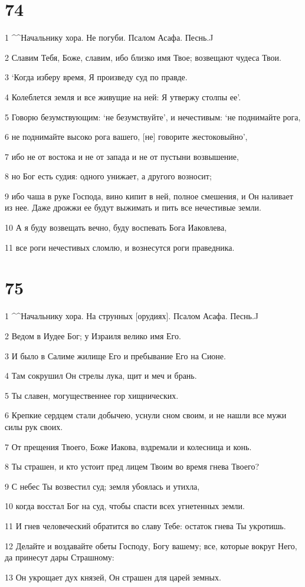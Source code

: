 \chapter{74}

\par 1 ^^Начальнику хора. Не погуби. Псалом Асафа. Песнь.^^
\par 2 Славим Тебя, Боже, славим, ибо близко имя Твое; возвещают чудеса Твои.
\par 3 `Когда изберу время, Я произведу суд по правде.
\par 4 Колеблется земля и все живущие на ней: Я утвержу столпы ее'.
\par 5 Говорю безумствующим: `не безумствуйте', и нечестивым: `не поднимайте рога,
\par 6 не поднимайте высоко рога вашего, [не] говорите жестоковыйно',
\par 7 ибо не от востока и не от запада и не от пустыни возвышение,
\par 8 но Бог есть судия: одного унижает, а другого возносит;
\par 9 ибо чаша в руке Господа, вино кипит в ней, полное смешения, и Он наливает из нее. Даже дрожжи ее будут выжимать и пить все нечестивые земли.
\par 10 А я буду возвещать вечно, буду воспевать Бога Иаковлева,
\par 11 все роги нечестивых сломлю, и вознесутся роги праведника.

\chapter{75}

\par 1 ^^Начальнику хора. На струнных [орудиях]. Псалом Асафа. Песнь.^^
\par 2 Ведом в Иудее Бог; у Израиля велико имя Его.
\par 3 И было в Салиме жилище Его и пребывание Его на Сионе.
\par 4 Там сокрушил Он стрелы лука, щит и меч и брань.
\par 5 Ты славен, могущественнее гор хищнических.
\par 6 Крепкие сердцем стали добычею, уснули сном своим, и не нашли все мужи силы рук своих.
\par 7 От прещения Твоего, Боже Иакова, вздремали и колесница и конь.
\par 8 Ты страшен, и кто устоит пред лицем Твоим во время гнева Твоего?
\par 9 С небес Ты возвестил суд; земля убоялась и утихла,
\par 10 когда восстал Бог на суд, чтобы спасти всех угнетенных земли.
\par 11 И гнев человеческий обратится во славу Тебе: остаток гнева Ты укротишь.
\par 12 Делайте и воздавайте обеты Господу, Богу вашему; все, которые вокруг Него, да принесут дары Страшному:
\par 13 Он укрощает дух князей, Он страшен для царей земных.

